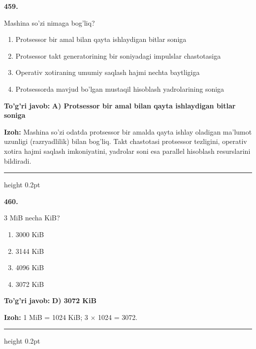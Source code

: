 \documentclass[10pt,a4paper,oneside]{article}
\begin{document}
\noindent\textbf{\color{ink}459.}
\par
Mashina so'zi nimaga bog'liq?
\begin{enumerate}[label=\Alph*),leftmargin=9mm]
\item Protsessor bir amal bilan qayta ishlaydigan bitlar soniga
\item Protsessor takt generatorining bir soniyadagi impulslar chastotasiga
\item Operativ xotiraning umumiy saqlash hajmi nechta baytligiga
\item Protsessorda mavjud bo'lgan mustaqil hisoblash yadrolarining soniga
\end{enumerate}
\begin{tcolorbox}[enhanced,breakable,colback=teal!4,colframe=teal!50!black,boxrule=0.5pt,arc=1.1mm,left=3mm,right=3mm,top=1.7mm,bottom=1.7mm,before skip=2mm,after skip=2mm]
\textbf{\color{teal}To'g'ri javob:} \textbf{A) Protsessor bir amal bilan qayta ishlaydigan bitlar soniga}
\par\smallskip
\textbf{Izoh:} Mashina so'zi odatda protsessor bir amalda qayta ishlay oladigan ma'lumot uzunligi (razryadlilik) bilan bog'liq. Takt chastotasi protsessor tezligini, operativ xotira hajmi saqlash imkoniyatini, yadrolar soni esa parallel hisoblash resurslarini bildiradi.
\end{tcolorbox}
\vspace{2mm}\hrule height 0.2pt \vspace{3mm}

\noindent\textbf{\color{ink}460.}
\par
3 MiB necha KiB?
\begin{enumerate}[label=\Alph*),leftmargin=9mm]
\item 3000 KiB
\item 3144 KiB
\item 4096 KiB
\item 3072 KiB
\end{enumerate}
\begin{tcolorbox}[enhanced,breakable,colback=teal!4,colframe=teal!50!black,boxrule=0.5pt,arc=1.1mm,left=3mm,right=3mm,top=1.7mm,bottom=1.7mm,before skip=2mm,after skip=2mm]
\textbf{\color{teal}To'g'ri javob:} \textbf{D) 3072 KiB}
\par\smallskip
\textbf{Izoh:} 1 MiB = 1024 KiB; 3 \ensuremath{\times} 1024 = 3072.
\end{tcolorbox}
\vspace{2mm}\hrule height 0.2pt \vspace{3mm}
\end{document}
